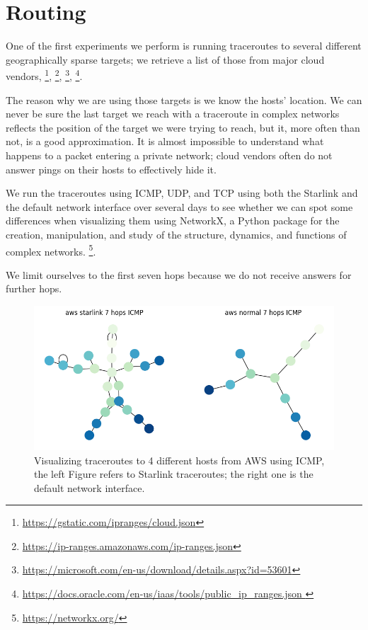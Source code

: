 \documentclass[IN,11pt,twoside,openright,idp,english]{tumthesis}
\begin{document}
\section{Routing}
    
One of the first experiments we perform is running traceroutes to several different geographically sparse targets; we retrieve a list of those from major cloud vendors, \footnote{\url{ https://gstatic.com/ipranges/cloud.json}}, \footnote{\url{https://ip-ranges.amazonaws.com/ip-ranges.json}}, \footnote{\url{https://microsoft.com/en-us/download/details.aspx?id=53601}}, \footnote{\url{https://docs.oracle.com/en-us/iaas/tools/public_ip_ranges.json }}.
    
The reason why we are using those targets is we know the hosts' location. We can never be sure the last target we reach with a traceroute in complex networks reflects the position of the target we were trying to reach, but it, more often than not, is a good approximation. 
It is almost impossible to understand what happens to a packet entering a private network; cloud vendors often do not answer pings on their hosts to effectively hide it. 
    
We run the traceroutes using ICMP, UDP, and TCP using both the Starlink and the default network interface over several days to see whether we can spot some differences when visualizing them using NetworkX, a Python package for the creation, manipulation, and study of the structure, dynamics, and functions of complex networks. \footnote{\url{https://networkx.org/}}. 

We limit ourselves to the first seven hops because we do not receive answers for further hops. 
    
\begin{figure}
    \label{fig:tr_aws_icmp}
    \centering
    \includegraphics[width=0.6\columnwidth]{img/tr_aws_icmp.png}
    \caption{Visualizing traceroutes to 4 different hosts from AWS using ICMP, the left Figure refers to Starlink traceroutes; the right one is the default network interface.}
\end{figure}
    
\end{document}
